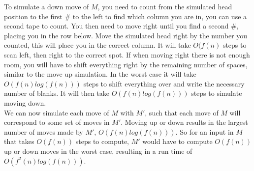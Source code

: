 \documentclass{assignment}
\begin{document}
\begin{problemlist}
\begin{answer}
To simulate a down move of $M$, you need to count from the simulated head position to the first $\#$ to the left to find which column you are in, you can use a second tape to count. You then need to move right until you find a second $\#$, placing you in the row below. Move the simulated head right by the number you counted, this will place you in the correct column. It will take $O(f(n)$ steps to scan left, then right to the correct spot. If when moving right there is not enough room, you will have to shift everything right by the remaining number of spaces, similar to the move up simulation. In the worst case it will take $O(f(n)log(f(n)))$ steps to shift everything over and write the necessary number of blanks. It will then take $O(f(n)log(f(n)))$ steps to simulate moving down.\\
We can now simulate each move of $M$ with $M'$, such that each move of $M$ will correspond to some set of moves in $M'$. Moving up or down results in the largest number of moves made by $M'$, $O(f(n)log(f(n)))$. So for an input in $M$ that takes $O(f(n))$ steps to compute, $M'$ would have to compute $O(f(n))$ up or down moves in the worst case, resulting in a run time of $O(f^2(n)log(f(n)))$.\\

\end{answer}


\end{problemlist}
\end{document}
